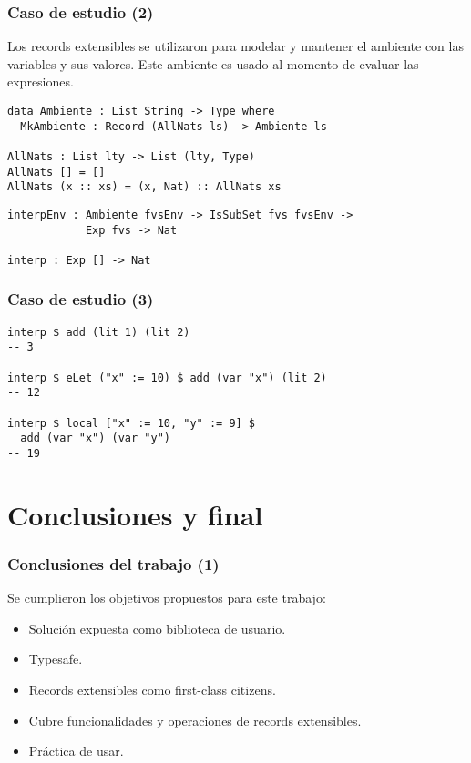 \documentclass{beamer}
\begin{document}
\begin{frame}[fragile]
\frametitle{Caso de estudio (2)}

Los records extensibles se utilizaron para modelar y mantener el ambiente con las variables y sus valores. Este ambiente es usado al momento de evaluar las expresiones.

\pause

\begin{definition}
\begin{verbatim}
data Ambiente : List String -> Type where
  MkAmbiente : Record (AllNats ls) -> Ambiente ls

AllNats : List lty -> List (lty, Type)
AllNats [] = []
AllNats (x :: xs) = (x, Nat) :: AllNats xs
\end{verbatim}
\end{definition}

\begin{definition}
\begin{verbatim}
interpEnv : Ambiente fvsEnv -> IsSubSet fvs fvsEnv -> 
            Exp fvs -> Nat

interp : Exp [] -> Nat
\end{verbatim}
\end{definition}
\end{frame}

\begin{frame}[fragile]
\frametitle{Caso de estudio (3)}

\begin{example}
\begin{verbatim}
interp $ add (lit 1) (lit 2)
-- 3

interp $ eLet ("x" := 10) $ add (var "x") (lit 2)
-- 12

interp $ local ["x" := 10, "y" := 9] $ 
  add (var "x") (var "y")
-- 19
\end{verbatim}
\end{example}

\end{frame}

\section{Conclusiones y final}

\begin{frame}
\frametitle{Conclusiones del trabajo (1)}

Se cumplieron los objetivos propuestos para este trabajo:

\begin{itemize}
\item Solución expuesta como biblioteca de usuario.
\item Typesafe.
\item Records extensibles como first-class citizens.
\item Cubre funcionalidades y operaciones de records extensibles.
\item Práctica de usar.
\end{itemize}

\end{frame}
\end{document}
